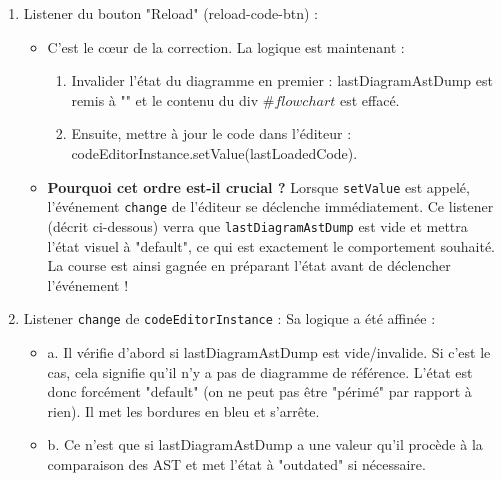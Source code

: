 \documentclass[11pt,a4paper]{article}
\begin{document}
\begin{enumerate}
    \item Listener du bouton "Reload" (reload-code-btn) :
    \begin{itemize}
        \item C'est le cœur de la correction. La logique est maintenant :
        \begin{enumerate}
            \item Invalider l'état du diagramme en premier : lastDiagramAstDump est remis à "" et le contenu du div $\#flowchart$ est effacé.
            \item Ensuite, mettre à jour le code dans l'éditeur : codeEditorInstance.setValue(lastLoadedCode).
        \end{enumerate}
        \item \textbf{Pourquoi cet ordre est-il crucial ?} Lorsque \texttt{setValue} est appelé, l'événement \texttt{change} de l'éditeur se déclenche immédiatement. Ce listener (décrit ci-dessous) verra que \texttt{lastDiagramAstDump} est vide et mettra l'état visuel à "default", ce qui est exactement le comportement souhaité. La course est ainsi gagnée en préparant l'état avant de déclencher l'événement !
    \end{itemize}

    \item Listener \texttt{change} de \texttt{codeEditorInstance} :
Sa logique a été affinée :
    \begin{itemize}
        \item a. Il vérifie d'abord si lastDiagramAstDump est vide/invalide. Si c'est le cas, cela signifie qu'il n'y a pas de diagramme de référence. L'état est donc forcément "default" (on ne peut pas être "périmé" par rapport à rien). Il met les bordures en bleu et s'arrête.
        \item b. Ce n'est que si lastDiagramAstDump a une valeur qu'il procède à la comparaison des AST et met l'état à "outdated" si nécessaire.
    \end{itemize}
    \end{enumerate}
\newpage

\clearpage
\printbibliography
\end{document}
